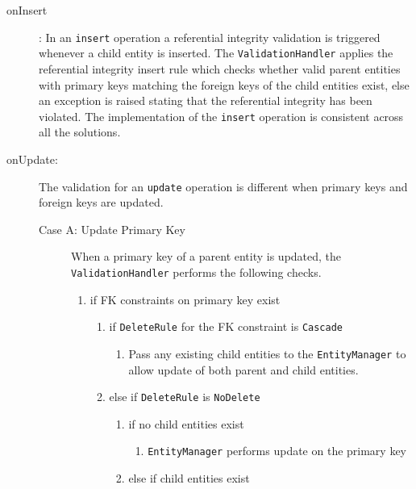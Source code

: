 		\begin{description}
		\item[onInsert]: 
		In an \texttt{insert} operation a referential
		integrity validation is triggered whenever a child entity is  inserted. 
		The \texttt{ValidationHandler} applies the referential integrity insert
		rule which checks whether  valid parent entities with
		primary keys matching the foreign keys of the child entities exist, else an
		exception is raised stating that the referential integrity has been violated.
		The implementation of the \texttt{insert} operation is consistent across all the
		solutions. 
		
		\item[onUpdate:] The validation for an \texttt{update} operation is different
		when primary keys and foreign keys are updated. 
		\begin{description}
		\item[Case A: Update Primary Key] When a  primary key of a
		parent entity is updated, the \texttt{ValidationHandler} performs the
		following checks.
		\renewcommand{\labelenumii}{\arabic{enumi}.\arabic{enumii}}
		\renewcommand{\labelenumiii}{\arabic{enumi}.\arabic{enumii}.\arabic{enumiii}}
		\begin{enumerate}
		  \item if \ac{FK} constraints on primary key exist
		  	\begin{enumerate}		  	
		    \item if \texttt{DeleteRule} for the \ac{FK} constraint is
		    \texttt{Cascade}
		    	\begin{enumerate}
		    	  \item Pass any existing child entities to the \texttt{EntityManager} to
		    	  allow update of both parent and child entities.
				\end{enumerate}
			\item else if \texttt{DeleteRule}  is \texttt{NoDelete}
				\begin{enumerate}
				  \item if no child entities exist
				  		\begin{enumerate}
				  		  \item \texttt{EntityManager} performs update on  the primary key
				  		\end{enumerate}
				  \item else if child entities exist
				   		\begin{enumerate}

\end{enumerate}
\end{enumerate}
\end{enumerate}
\end{enumerate}
\end{description}
\end{description}

